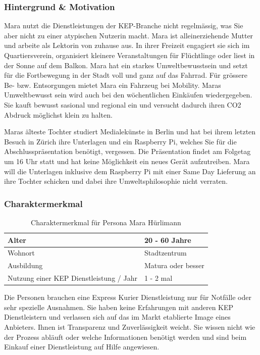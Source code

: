 \begin{description}
\subsubsection{Hintergrund \& Motivation}
Mara nutzt die Dienstleistungen der KEP-Branche nicht regelmässig, was Sie aber nicht zu einer atypischen Nutzerin macht. Mara ist alleinerziehende Mutter und arbeite als Lektorin von zuhause aus. In ihrer Freizeit engagiert sie sich im Quartiersverein, organisiert kleinere Veranstaltungen für Flüchtlinge oder liest in der Sonne auf dem Balkon. Mara hat ein starkes Umweltbewusstsein und setzt für die Fortbewegung in der Stadt voll und ganz auf das Fahrrad. Für grössere Be- bzw. Entsorgungen mietet Mara ein Fahrzeug bei Mobility. Maras Umweltbewusst sein wird auch bei den wöchentlichen Einkäufen wiedergegeben. Sie kauft bewusst sasional und regional ein und versucht dadurch ihren CO2 Abdruck möglichst klein zu halten.

Maras älteste Tochter studiert Medialekünste in Berlin und hat bei ihrem letzten Besuch in Zürich ihre Unterlagen und ein Raspberry Pi, welches Sie für die Abschlusspräsentation benötigt, vergessen. Die Präsentation findet am Folgetag um 16 Uhr statt und hat keine Möglichkeit ein neues Gerät aufzutreiben. Mara will die Unterlagen inklusive dem Raspberry Pi mit einer Same Day Lieferung an ihre Tochter schicken und dabei ihre Umweltsphilosophie nicht verraten.

\subsubsection{Charaktermerkmal}
\begin{table}[]
\centering

\label{my-label}
\begin{tabular}{|l|l|}
\hline
Alter                                   & 20 - 60 Jahre        \\ \hline
Wohnort                                 & Stadtzentrum         \\ \hline
Ausbildung                              & Matura oder besser \\ \hline
Nutzung einer KEP Dienstleistung / Jahr & 1 - 2 mal            \\ \hline
\end{tabular}
\caption{Charaktermerkmal für Persona Mara Hürlimann}
\end{table}

Die Personen brauchen eine Express Kurier Dienstleistung nur für Notfälle oder sehr spezielle Ausnahmen. Sie haben keine Erfahrungen mit anderen KEP Dienstleistern und verlassen sich auf das im Markt etablierte Image eines Anbieters. Ihnen ist Transparenz und Zuverlässigkeit weicht. Sie wissen nicht wie der Prozess abläuft oder welche Informationen benötigt werden und sind beim Einkauf einer Dienstleistung auf Hilfe angewiesen.




\end{description}
